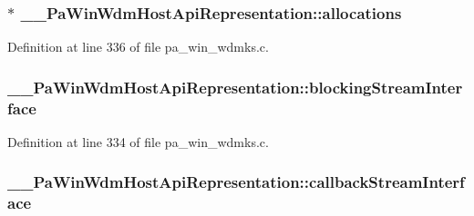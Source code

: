 \subsubsection[{\texorpdfstring{allocations}{allocations}}]{$\ast$ \+\_\+\+\_\+\+Pa\+Win\+Wdm\+Host\+Api\+Representation\+::allocations}\hypertarget{struct_____pa_win_wdm_host_api_representation_aefaac80ee7c20f6ab43463d2a153d64c}{}\label{struct_____pa_win_wdm_host_api_representation_aefaac80ee7c20f6ab43463d2a153d64c}


Definition at line 336 of file pa\+\_\+win\+\_\+wdmks.\+c.

\subsubsection[{\texorpdfstring{blocking\+Stream\+Interface}{blockingStreamInterface}}]{ \+\_\+\+\_\+\+Pa\+Win\+Wdm\+Host\+Api\+Representation\+::blocking\+Stream\+Interface}\hypertarget{struct_____pa_win_wdm_host_api_representation_a040a7b4993995b26c9128826a8644050}{}\label{struct_____pa_win_wdm_host_api_representation_a040a7b4993995b26c9128826a8644050}


Definition at line 334 of file pa\+\_\+win\+\_\+wdmks.\+c.

\subsubsection[{\texorpdfstring{callback\+Stream\+Interface}{callbackStreamInterface}}]{ \+\_\+\+\_\+\+Pa\+Win\+Wdm\+Host\+Api\+Representation\+::callback\+Stream\+Interface}\hypertarget{struct_____pa_win_wdm_host_api_representation_af4dec3b34a520b1b2aa393fbca9e2c9e}{}\label{struct_____pa_win_wdm_host_api_representation_af4dec3b34a520b1b2aa393fbca9e2c9e}



